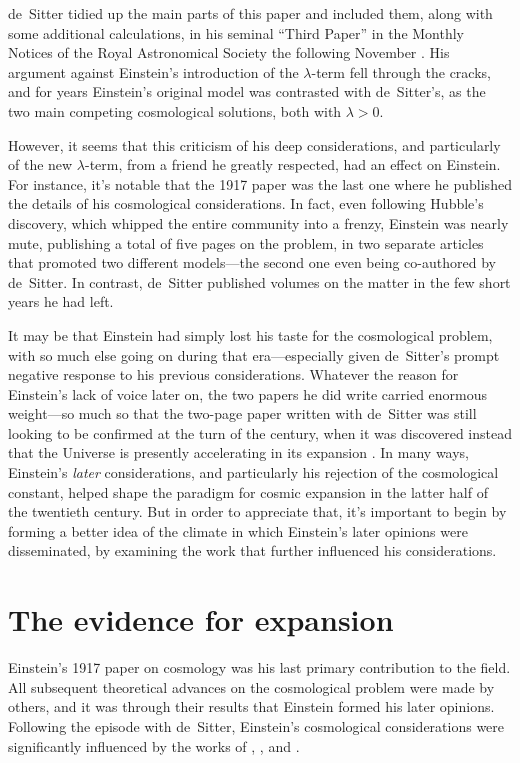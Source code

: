 \documentclass[12 pt]{article}
\begin{document}
de~Sitter tidied up the main parts of this paper and included them, along with some additional calculations, in his seminal ``Third Paper'' in the Monthly Notices of the Royal Astronomical Society the following November \citep{deSitter1917b}. His argument against Einstein's introduction of the $\lambda$-term fell through the cracks, and for years Einstein's original model was contrasted with de~Sitter's, as the two main competing cosmological solutions, both with $\lambda>0$.

However, it seems that this criticism of his deep considerations, and particularly of the new $\lambda$-term, from a friend he greatly respected, had an effect on Einstein. For instance, it's notable that the 1917 paper was the last one where he published the details of his cosmological considerations. In fact, even following Hubble's discovery, which whipped the entire community into a frenzy, Einstein was nearly mute, publishing a total of five pages on the problem, in two separate articles that promoted two different models---the second one even being co-authored by de~Sitter. In contrast, de~Sitter published volumes on the matter in the few short years he had left. 

It may be that Einstein had simply lost his taste for the cosmological problem, with so much else going on during that era---especially given de~Sitter's prompt negative response to his previous considerations. Whatever the reason for Einstein's lack of voice later on, the two papers he did write carried enormous weight---so much so that the two-page paper written with de~Sitter was still looking to be confirmed at the turn of the century, when it was discovered instead that the Universe is presently accelerating in its expansion \citep{Riess1998,Perlmutter1999}. In many ways, Einstein's \textit{later} considerations, and particularly his rejection of the cosmological constant, helped shape the paradigm for cosmic expansion in the latter half of the twentieth century. But in order to appreciate that, it's important to begin by forming a better idea of the climate in which Einstein's later opinions were disseminated, by examining the work that further influenced his considerations.

\section{The evidence for expansion}
\label{sec:3}
Einstein's 1917 paper on cosmology was his last primary contribution to the field. All subsequent theoretical advances on the cosmological problem were made by others, and it was through their results that Einstein formed his later opinions. Following the episode with de~Sitter, Einstein's cosmological considerations were significantly influenced by the works of \citet{Eddington1923}, \citet{Weyl1923a,Weyl1923b}, and \citet{Friedmann1922}. 
\end{document}
